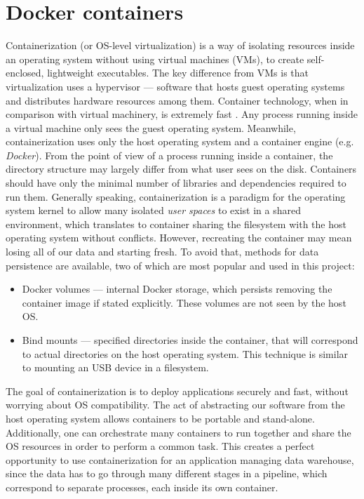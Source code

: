 \section{Docker containers}
Containerization (or OS-level virtualization) is a way of isolating resources inside an operating system without using virtual machines (VMs), to create self-enclosed, lightweight executables. The key difference from VMs is that virtualization uses a hypervisor --- software that hosts guest operating systems and distributes hardware resources among them. Container technology, when in comparison with virtual machinery, is extremely fast \cite{integration}. Any process running inside a virtual machine only sees the guest operating system. Meanwhile, containerization uses only the host operating system and a container engine (e.g. \textit{Docker}). From the point of view of a process running inside a container, the directory structure may largely differ from what user sees on the disk. Containers should have only the minimal number of libraries and dependencies required to run them. Generally speaking, containerization is a paradigm for the operating system kernel to allow many isolated \textit{user spaces} to exist in a shared environment, which translates to container sharing the filesystem with the host operating system without conflicts. However, recreating the container may mean losing all of our data and starting fresh. To avoid that, methods for data persistence are available, two of which are most popular and used in this project:

\begin{itemize}
    \item Docker volumes --- internal Docker storage, which persists removing the container image if stated explicitly. These volumes are not seen by the host OS.
    \item Bind mounts --- specified directories inside the container, that will correspond to actual directories on the host operating system. This technique is similar to mounting an USB device in a filesystem.
\end{itemize}

The goal of containerization is to deploy applications securely and fast, without worrying about OS compatibility. The act of abstracting our software from the host operating system allows containers to be portable and stand-alone. Additionally, one can orchestrate many containers to run together and share the OS resources in order to perform a common task. This creates a perfect opportunity to use containerization for an application managing data warehouse, since the data has to go through many different stages in a pipeline, which correspond to separate processes, each inside its own container.


